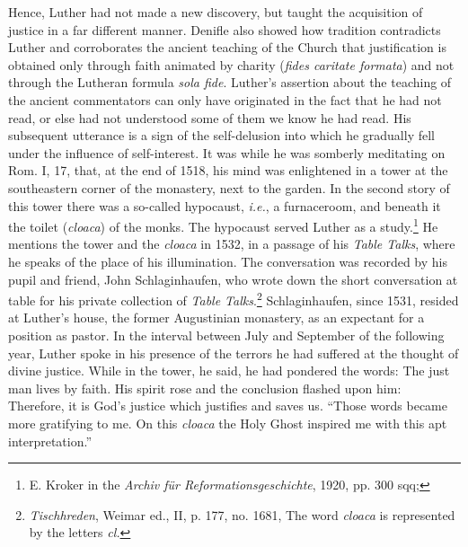 Hence, Luther had not made a new discovery,
but taught the acquisition of justice in a far different manner. Denifle
also showed how tradition contradicts Luther and corroborates the
ancient teaching of the Church that justification is obtained only
through faith animated by charity (\textit{fides caritate formata}) and not
through the Lutheran formula \textit{sola fide}. Luther’s assertion about the
teaching of the ancient commentators can only have originated in the
fact that he had not read, or else had not understood some of them we
know he had read. His subsequent utterance is a sign of the self-delusion
into which he gradually fell under the influence of self-interest.
It was while he was somberly meditating on Rom. I, 17, that, at
the end of 1518, his mind was enlightened in a tower at the southeastern
corner of the monastery, next to the garden. In the second
story of this tower there was a so-called hypocaust, \textit{i.e.}, a furnaceroom,
and beneath it the toilet (\textit{cloaca}) of the monks. The hypocaust
served Luther as a study.\footnote{E. Kroker in the \textit{Archiv für Reformationsgeschichte}, 1920, pp. 300 sqq;}
He mentions the tower and the
\textit{cloaca} in 1532, in a passage of his \textit{Table Talks}, where he speaks of
the place of his illumination. The conversation was recorded by
his pupil and friend, John Schlaginhaufen, who wrote down the short
conversation at table for his private collection of \textit{Table Talks}.\footnote
{\textit{Tischhreden}, Weimar ed., II, p. 177, no. 1681, The word \textit{cloaca} is represented
by the letters \textit{cl.}}
Schlaginhaufen, since 1531, resided at Luther’s house, the former
Augustinian monastery, as an expectant for a position as pastor. In
the interval between July and September of the following year, Luther spoke
in his presence of the terrors he had suffered at the thought
of divine justice. While in the tower, he said, he had pondered the
words: The just man lives by faith. His spirit rose and the conclusion
flashed upon him: Therefore, it is God’s justice which justifies and
saves us. “Those words became more gratifying to me. On this \textit{cloaca}
the Holy Ghost inspired me with this apt interpretation.”

